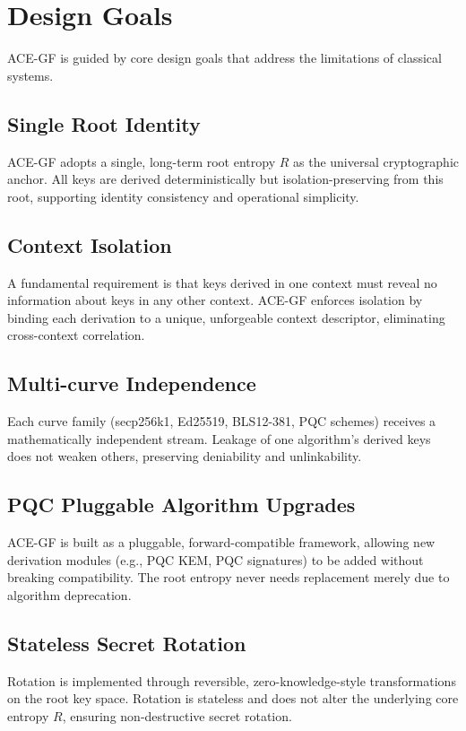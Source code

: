 \documentclass[11pt,a4paper]{article}
\begin{document}
\section{Design Goals}
ACE-GF is guided by core design goals that address the limitations of classical systems.

\subsection{Single Root Identity}
ACE-GF adopts a single, long-term root entropy $R$ as the universal cryptographic anchor. All keys are derived deterministically but isolation-preserving from this root, supporting identity consistency and operational simplicity.

\subsection{Context Isolation}
A fundamental requirement is that keys derived in one context must reveal no information about keys in any other context. ACE-GF enforces isolation by binding each derivation to a unique, unforgeable context descriptor, eliminating cross-context correlation. 

\subsection{Multi-curve Independence}
Each curve family (secp256k1, Ed25519, BLS12-381, PQC schemes) receives a mathematically independent stream. Leakage of one algorithm's derived keys does not weaken others, preserving deniability and unlinkability.

\subsection{PQC Pluggable Algorithm Upgrades}
ACE-GF is built as a pluggable, forward-compatible framework, allowing new derivation modules (e.g., PQC KEM, PQC signatures) to be added without breaking compatibility. The root entropy never needs replacement merely due to algorithm deprecation.

\subsection{Stateless Secret Rotation}
Rotation is implemented through reversible, zero-knowledge-style transformations on the root key space. Rotation is stateless and does not alter the underlying core entropy $R$, ensuring non-destructive secret rotation.
\end{document}
